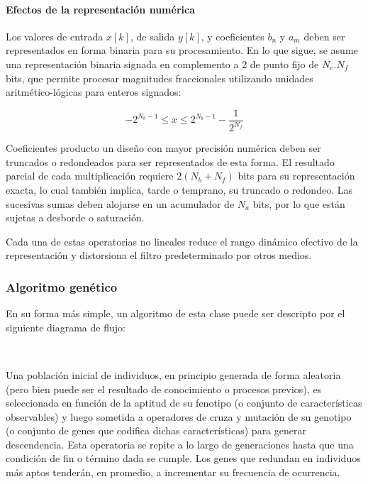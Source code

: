 \documentclass[11pt]{article}
\begin{document}
    \paragraph{Efectos de la representación
numérica}\label{efectos-de-la-representaciuxf3n-numuxe9rica}

Los valores de entrada \(x[k]\), de salida \(y[k]\), y coeficientes
\(b_n\) y \(a_m\) deben ser representados en forma binaria para su
procesamiento. En lo que sigue, se asume una representación binaria
signada en complemento a 2 de punto fijo de \(N_e.N_f\) bits, que
permite procesar magnitudes fraccionales utilizando unidades
aritmético-lógicas para enteros signados:

\[ -2^{N_b-1} \leq x \leq 2^{N_b-1}-\frac{1}{2^{N_f}} \]

Coeficientes producto un diseño con mayor precisión numérica deben ser
truncados o redondeados para ser representados de esta forma. El
resultado parcial de cada multiplicación requiere \(2(N_b + N_f)\) bits
para su representación exacta, lo cual también implica, tarde o
temprano, su truncado o redondeo. Las sucesivas sumas deben alojarse en
un acumulador de \(N_a\) bits, por lo que están sujetas a desborde o
saturación.

Cada una de estas operatorias no lineales reduce el rango dinámico
efectivo de la representación y distorsiona el filtro predeterminado por
otros medios.

    \subsubsection{Algoritmo genético}\label{algoritmo-genuxe9tico}

En su forma más simple, un algoritmo de esta clase puede ser descripto
por el siguiente diagrama de flujo:

    
    \begin{center}
    \end{center}
    { \hspace*{\fill} \\}
    

    Una población inicial de individuos, en principio generada de forma
aleatoria (pero bien puede ser el resultado de conocimiento o procesos
previos), es seleccionada en función de la aptitud de su fenotipo (o
conjunto de características observables) y luego sometida a operadores
de cruza y mutación de su genotipo (o conjunto de genes que codifica
dichas características) para generar descendencia. Esta operatoria se
repite a lo largo de generaciones hasta que una condición de fin o
término dada se cumple. Los genes que redundan en individuos más aptos
tenderán, en promedio, a incrementar su frecuencia de ocurrencia.
\end{document}
